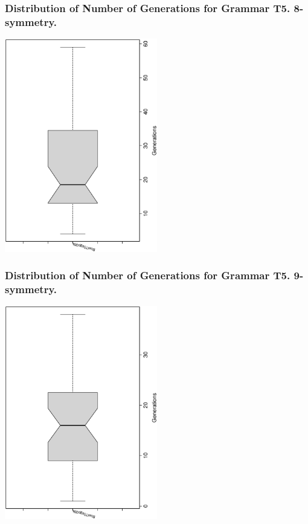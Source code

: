 \documentclass[18pt,c]{beamer}
\begin{document}
 \begin{frame}
 \frametitle{ Distribution of Number of Generations for Grammar T5. 8-symmetry. }
 \begin{center}
\includegraphics[width=0.5\textwidth, angle=-90]
{ExpFboxplottGenerations006.eps}
 \end{center}
 \label{ExpFboxplottGenerations006.eps}  
 \end{frame}

 \begin{frame}
 \frametitle{ Distribution of Number of Generations for Grammar T5. 9-symmetry. }
 \begin{center}
\includegraphics[width=0.5\textwidth, angle=-90]
{ExpFboxplottGenerations007.eps}
 \end{center}
 \label{ExpFboxplottGenerations007.eps}  
 \end{frame}
\end{document}
